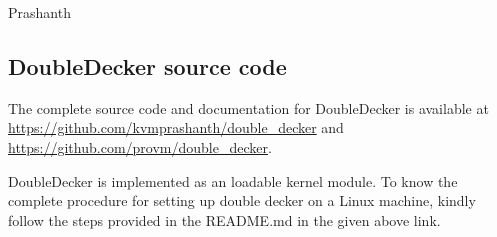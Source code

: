 \documentclass[11pt,a4paper]{report}
\newcommand{\dd}{DoubleDecker}
\begin{document}
    \vspace*{2em}
    \noindent Prashanth
    
    
  \tableofcontents
  \listoffigures
  \listoftables
  \cleardoublepage
  \setcounter{page}{1}
  \setlength{\parskip}{1em}
  
    
   
  
  
  
  
  
  
  
    
  
  \appendix
  \begin{appendices}
    \chapter{\dd{} source code}
      The complete source code and documentation 
      for \dd{} is available at \url{https://github.com/kvmprashanth/double_decker} and
      \url{https://github.com/provm/double_decker}.
      
      \dd{} is implemented as an loadable kernel module. To know the complete procedure for setting up double decker on
      a Linux machine, kindly follow the steps provided in the README.md in the given above link.
    
  \end{appendices}
\end{document}
